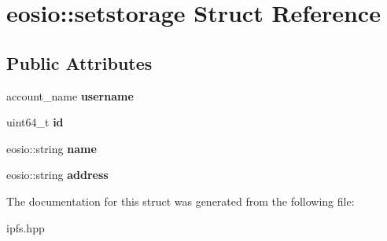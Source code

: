 \hypertarget{structeosio_1_1setstorage}{}\section{eosio\+:\+:setstorage Struct Reference}
\label{structeosio_1_1setstorage}
\subsection*{Public Attributes}
\begin{DoxyCompactItemize}
\item 
\mbox{\label{structeosio_1_1setstorage_ab06891a2cc72dff9fb3a99735ddac5d3}} 
account\+\_\+name {\bfseries username}
\item 
\mbox{\label{structeosio_1_1setstorage_ad69368e9aec666e62845c0f4b3a6cbe9}} 
uint64\+\_\+t {\bfseries id}
\item 
\mbox{\label{structeosio_1_1setstorage_a38312d8e2da2c8fca05daacbc51c9495}} 
eosio\+::string {\bfseries name}
\item 
\mbox{\label{structeosio_1_1setstorage_a91534039a2ff8ca4ce6395032a88ec57}} 
eosio\+::string {\bfseries address}
\end{DoxyCompactItemize}


The documentation for this struct was generated from the following file\+:\begin{DoxyCompactItemize}
\item 
ipfs.\+hpp\end{DoxyCompactItemize}
